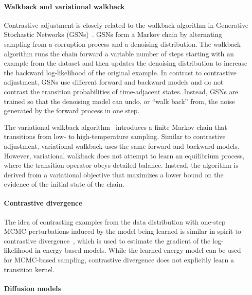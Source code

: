 \documentclass[10pt,twocolumn,letterpaper]{article}
\begin{document}
\paragraph{Walkback and variational walkback}

Contrastive adjustment is closely related to the walkback algorithm in Generative Stochastic Networks (GSNs)~\cite{alain15_gsns}.
GSNs form a Markov chain by alternating sampling from a corruption process and a denoising distribution.
The walkback algorithm runs the chain forward a variable number of steps starting with an example from the dataset and then updates the denoising distribution to increase the backward log-likelihood of the original example.
In contrast to contrastive adjustment, GSNs use different forward and backward models and do not contrast the transition probabilities of time-adjacent states.
Instead, GSNs are trained so that the denoising model can undo, or ``walk back'' from, the noise generated by the forward process in one step.

The variational walkback algorithm~\cite{goyal2017variational} introduces a finite Markov chain that transitions from low- to high-temperature sampling.
Similar to contrastive adjustment, variational walkback uses the same forward and backward models.
However, variational walkback does not attempt to learn an equilibrium process, where the transition operator obeys detailed balance.
Instead, the algorithm is derived from a variational objective that maximizes a lower bound on the evidence of the initial state of the chain.

\paragraph{Contrastive divergence}

The idea of contrasting examples from the data distribution with one-step MCMC perturbations induced by the model being learned is similar in spirit to contrastive divergence~\cite{hinton2002training}, which is used to estimate the gradient of the log-likelihood in energy-based models.
While the learned energy model can be used for MCMC-based sampling, contrastive divergence does not explicitly learn a transition kernel.

\paragraph{Diffusion models}
\end{document}
